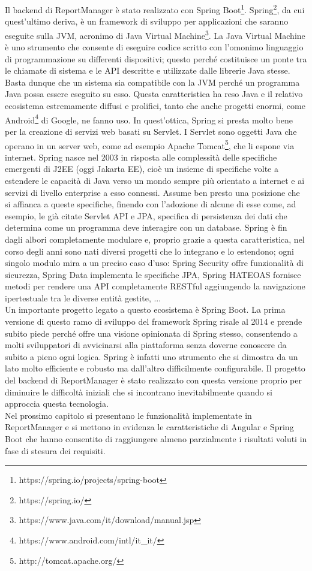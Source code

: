 Il backend di ReportManager è stato realizzato con Spring Boot\footnote{https://spring.io/projects/spring-boot}.
Spring\footnote{https://spring.io/}, da cui quest'ultimo deriva, è un framework di sviluppo per applicazioni che saranno eseguite sulla JVM, 
acronimo di Java Virtual Machine\footnote{https://www.java.com/it/download/manual.jsp}.
La Java Virtual Machine è uno strumento che consente di eseguire codice scritto con l'omonimo linguaggio di programmazione su differenti dispositivi; questo perché costituisce 
un ponte tra le chiamate di sistema e le API descritte e utilizzate dalle librerie Java stesse.
Basta dunque che un sistema sia compatibile con la JVM perché un programma Java possa essere eseguito su esso.
Questa caratteristica ha reso Java e il relativo ecosistema estremamente diffusi e prolifici, tanto che anche progetti enormi, come Android\footnote{https://www.android.com/intl/it\_it/} 
di Google, ne fanno uso.
In quest'ottica, Spring si presta molto bene per la creazione di servizi web basati su Servlet.
I Servlet sono oggetti Java che operano in un server web, come ad esempio Apache Tomcat\footnote{http://tomcat.apache.org/}, che li espone via internet.
Spring nasce nel 2003 in risposta alle complessità delle specifiche emergenti di J2EE (oggi Jakarta EE), cioè un insieme di specifiche volte a estendere le capacità di Java 
verso un mondo sempre più orientato a internet e ai servizi di livello enterprise a esso connessi.
Assume ben presto una posizione che si affianca a queste specifiche, finendo con l'adozione di alcune di esse come, ad esempio, le già citate Servlet API e JPA, specifica di 
persistenza dei dati che determina come un programma deve interagire con un database.
Spring è fin dagli albori completamente modulare e, proprio grazie a questa caratteristica, nel corso degli anni sono nati diversi progetti che lo integrano e lo estendono;
ogni singolo modulo mira a un preciso caso d'uso: Spring Security offre funzionalità di sicurezza, Spring Data implementa le specifiche JPA, Spring HATEOAS fornisce metodi per 
rendere una API completamente RESTful aggiungendo la navigazione ipertestuale tra le diverse entità gestite, ...
\\
Un importante progetto legato a questo ecosistema è Spring Boot.
La prima versione di questo ramo di sviluppo del framework Spring risale al 2014 e prende subito piede perché offre una visione opinionata di Spring stesso, consentendo a molti
sviluppatori di avvicinarsi alla piattaforma senza doverne conoscere da subito a pieno ogni logica.
Spring è infatti uno strumento che si dimostra da un lato molto efficiente e robusto ma dall'altro difficilmente configurabile.
Il progetto del backend di ReportManager è stato realizzato con questa versione proprio per diminuire le difficoltà iniziali che si incontrano inevitabilmente
quando si approccia questa tecnologia.
\\
Nel prossimo capitolo si presentano le funzionalità implementate in ReportManager e si mettono in evidenza le caratteristiche di Angular e Spring Boot che hanno consentito 
di raggiungere almeno parzialmente i risultati voluti in fase di stesura dei requisiti.